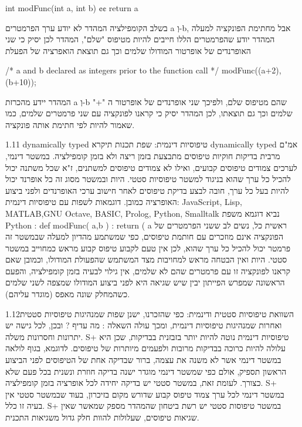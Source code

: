       int modFunc(int a, int b) {¢¢
        return a%
      }

      בשלב הקומפילציה המהדר לא יודע ערך הפרמטרים a וְ-b, אבל מחתימת הפונקציה למעלה המהדר יודע שהפרמטרים הללו חייבים להיות מטיפוס "שלם", המהדר לכן יסיק כי שני האופרנדים של אופרטור המודולו שלמים וכך גם תוצאת הואפרציה של הפעלת %

      /* a and b declared as integers prior to the function call */
      modFunc((a+2),(b+10));

      המהדר יידע מהכרזת a וְ-b שהם מטיפוס שלם, ולפיכך שני אופרנדים של אופרטור ה "+" שלמים וכך גם תוצאתו, לכן המהדר יסיק כי קראנו לפונקציה עם שני פרמטרים שלמים, כמו שאמור להיות לפי חתימת אותה פונקציה.

      1.11 dynamically typed טיפוסיות דינמית:
      שפת תכנות תיקרא dynamically typed אמ"ם מרבית בדיקות חוקיות טיפוסים מתבצעת בזמן ריצה ולא בזמן קומפילציה. במשטר דינמי, לערכים צמודים טיפוסים קבועים, ואילו לא צמודים טיפוסים למשתנים, ז"א שכל משתנה יכול להכיל כל ערך שהוא בניגוד למשטר טיפוסיות סטטי.
      היות ובמשטר מסוג זה כל אופרנד יכול להיות בעל כל ערך, חובה לבצע בדיקת טיפוסים לאחר חישוב ערכי האופרנדים ולפני ביצוע האופרציה כמובן.
      דוגמאות לשפות עם טיפוסיות דינמית:
      JavaScript, Lisp, MATLAB,GNU Octave, BASIC, Prolog, Python, Smalltalk
      נביא דוגמא משפת Python :
      def modFunc( a,b ) :
      return ( a %
      ראשית כל, נשים לב ששני הפרמטרים של הפונקציה אינם מוזכרים עם חותמת טיפוסים, כפי שמשתמע מהדיון למעלה שבמשטר זה פרמטר יכול להכיל כל ערך שהוא, לכן אין טעם לקבוע טיפוס קבוע מראש כמחוייב במשטר סטטי.
      היות ואין הבטחה מראש למחויבות מצד המשתמש שהפעולת המודולו, וכמובן שאם קראנו לפונקציה זו עם פרמטרים שהם לא שלמים, אין גילוי לבעיה בזמן קומפילציה, והפעם הראשונה שמפרש הפייתון יבין שיש שגיאה היא לפני ביצוע המודולו שמצפה לשני שלמים כשהמחלק שונה מאפס (מוגדר עליהם).

      1.12השוואת טיפוסיות סטטית ודינמית:
      כפי שהזכרנו, ישנן שפות שמנהיגות טיפוסיות סטטית ואחרות שמנהיגות טיפוסיות דינמית, ומכך עולה השאלה : מה עדיף ?
      ובכן, לכל גישה יש יתרונות וחסרונות משלה.
      S+ טיפוסיות דינמית נוטה להיות יותר בזבזנית בבדיקות, שכן היא עלולה להיות כרוכה בבדיקות מרובות ולפעמים מיותרות של טיפוסים. לדוגמא, בגוף לולאה במשטר דינמי אשר לא משנה את עצמה, ברור שבדיקה אחת של הטיפוסים לפני הביצוע הראשון תספיק, אולם כפי שמשטר דינמי מוגדר ישנה בדיקה חוזרת ונשנית בכל פעם שלא כצורך. לעומת זאת, במשטר סטטי יש בדיקה יחידה לכל אופרציה בזמן קומפילציה.
      S+ במשטר דינמי לכל ערך צמוד טיפוס קבוע שדורש מקום בזיכרון, בעוד שבמשטר סטטי אין בעיה זו כלל.
      S+ במשטר טיפוסות סטטי יש רשת ביטחון שהמהדר מספק שמאשר שאין שגיאות טיפוסים, שעלולות להוות חלק גדול משגיאות התכנית.

